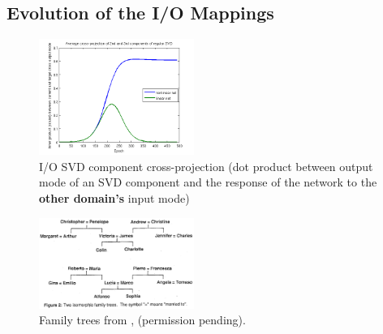 \documentclass[10pt,letterpaper]{article}
\begin{document}
\subsection{Evolution of the I/O Mappings}
%
\begin{figure}
\centering
\includegraphics[width=0.45\textwidth]{figures/SVD_cross_projection_learning.png}
\caption{I/O SVD component cross-projection (dot product between output mode of an SVD component and the response of the network to the \textbf{other domain's} input mode)}
\label{SVD_cross_projection_learning}
\end{figure}
\begin{figure}
\centering
\includegraphics[width=0.45\textwidth]{figures/hinton_family_tree_figure.png}
\caption{Family trees from \citet{Hinton1986}, (permission pending).}
\label{hinton_family_tree_figure}
\end{figure}
\end{document}
